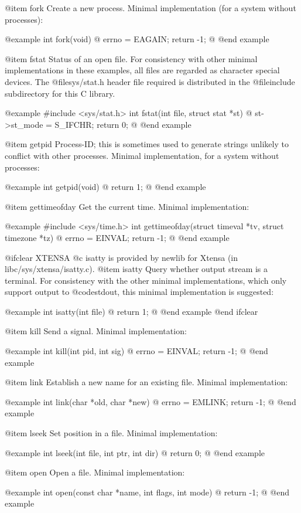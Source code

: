 @item fork
Create a new process.  Minimal implementation (for a system without processes):

@example
int fork(void) @{
  errno = EAGAIN;
  return -1;
@}
@end example

@item fstat
Status of an open file.  For consistency with other minimal
implementations in these examples, all files are regarded as character
special devices.  The @file{sys/stat.h} header file required is
distributed in the @file{include} subdirectory for this C library.

@example
#include <sys/stat.h>
int fstat(int file, struct stat *st) @{
  st->st_mode = S_IFCHR;
  return 0;
@}
@end example

@item getpid
Process-ID; this is sometimes used to generate strings unlikely to
conflict with other processes.  Minimal implementation, for a system
without processes:

@example
int getpid(void) @{
  return 1;
@}
@end example

@item gettimeofday
Get the current time.  Minimal implementation:

@example
#include <sys/time.h>
int gettimeofday(struct timeval *tv,
                 struct timezone *tz) @{
  errno = EINVAL;
  return -1;
@}
@end example

@ifclear XTENSA
@c isatty is provided by newlib for Xtensa (in libc/sys/xtensa/isatty.c).
@item isatty
Query whether output stream is a terminal.   For consistency with the
other minimal implementations, which only support output to
@code{stdout}, this minimal implementation is suggested:

@example
int isatty(int file) @{
  return 1;
@}
@end example
@end ifclear

@item kill
Send a signal.  Minimal implementation:

@example
int kill(int pid, int sig) @{
  errno = EINVAL;
  return -1;
@}
@end example

@item link
Establish a new name for an existing file.  Minimal implementation:

@example
int link(char *old, char *new) @{
  errno = EMLINK;
  return -1;
@}
@end example

@item lseek
Set position in a file.  Minimal implementation:

@example
int lseek(int file, int ptr, int dir) @{
  return 0;
@}
@end example

@item open
Open a file.  Minimal implementation:

@example
int open(const char *name, int flags, int mode) @{
  return -1;
@}
@end example

